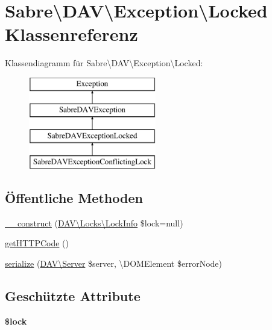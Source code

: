 \hypertarget{class_sabre_1_1_d_a_v_1_1_exception_1_1_locked}{}\section{Sabre\textbackslash{}D\+AV\textbackslash{}Exception\textbackslash{}Locked Klassenreferenz}
\label{class_sabre_1_1_d_a_v_1_1_exception_1_1_locked}
Klassendiagramm für Sabre\textbackslash{}D\+AV\textbackslash{}Exception\textbackslash{}Locked\+:\begin{figure}[H]
\begin{center}
\leavevmode
\includegraphics[height=4.000000cm]{class_sabre_1_1_d_a_v_1_1_exception_1_1_locked}
\end{center}
\end{figure}
\subsection*{Öffentliche Methoden}
\begin{DoxyCompactItemize}
\item 
\mbox{\hyperlink{class_sabre_1_1_d_a_v_1_1_exception_1_1_locked_af7e916f724fb6dd17aef1059a4cb7ce1}{\+\_\+\+\_\+construct}} (\mbox{\hyperlink{class_sabre_1_1_d_a_v_1_1_locks_1_1_lock_info}{D\+A\+V\textbackslash{}\+Locks\textbackslash{}\+Lock\+Info}} \$lock=null)
\item 
\mbox{\hyperlink{class_sabre_1_1_d_a_v_1_1_exception_1_1_locked_a8d4b466b707377f563b86b7af70c82ae}{get\+H\+T\+T\+P\+Code}} ()
\item 
\mbox{\hyperlink{class_sabre_1_1_d_a_v_1_1_exception_1_1_locked_af9fffe148ea513b21e69aee0b98a87b6}{serialize}} (\mbox{\hyperlink{class_sabre_1_1_d_a_v_1_1_server}{D\+A\+V\textbackslash{}\+Server}} \$server, \textbackslash{}D\+O\+M\+Element \$error\+Node)
\end{DoxyCompactItemize}
\subsection*{Geschützte Attribute}
\begin{DoxyCompactItemize}
\item 
\mbox{\label{class_sabre_1_1_d_a_v_1_1_exception_1_1_locked_a9c6ff6a415aa24065067c3ad587f86e2}} 
{\bfseries \$lock}
\end{DoxyCompactItemize}


